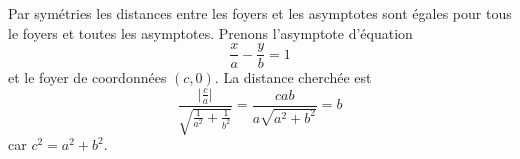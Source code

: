 Par symétries les distances entre les foyers et les asymptotes sont égales pour tous le foyers et toutes les asymptotes. Prenons l'asymptote d'équation
\begin{displaymath}
 \frac{x}{a}-\frac{y}{b}=1
\end{displaymath}
et le foyer de coordonnées $(c,0)$. La distance cherchée est
\begin{displaymath}
 \frac{\vert\frac{c}{a} \vert}{\sqrt{\frac{1}{a^2}+\frac{1}{b^2}}}
=\frac{cab}{a\sqrt{a^2+b^2}}=b
\end{displaymath}
car $c^2=a^2+b^2$.